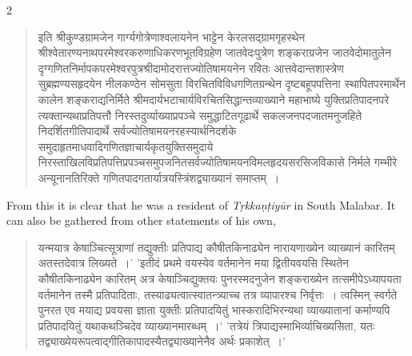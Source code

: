 \documentclass[11pt, openany]{book}
\begin{document}
\newpage
\thispagestyle{empty}
\begin{center}2\\\end{center}
\vspace{0.5cm}


\textendash

\begin{sloppypar} 
\begin{quote} 
इति श्रीकुण्डग्रामजेन
गार्ग्यगोत्रेणाश्वलायनेन भाट्टेन केरलसद्ग्रामगृहस्थेन श्रीश्वेतारण्यनाथपरमेश्वरकरुणाधिकरणभूतविग्रहेण 
जातवेदःपुत्रेण शङ्कराग्रजेन जातवेदोमातुलेन दृग्गणितनिर्मापकपरमेश्वरपुत्रश्रीदामोदरात्तज्योतिषामयनेन रवितः आत्तवेदान्तशास्त्रेण सुब्रह्मण्यसहृदयेन नीलकण्ठेन सोमसुता विरचितविविधगणितग्रन्थेन दृष्टबहूपपत्तिना स्थापितपरमार्थेन कालेन शङ्कराद्यनिर्मिते श्रीमदार्यभटाचार्यविरचितसिद्धान्तव्याख्याने महाभाष्ये युक्तिप्रतिपादनपरे त्यक्तान्यथाप्रतिपत्तौ निरस्तदुर्व्याख्याप्रपञ्चे समुद्धाटितगूढार्थे सकलजनपदजातमनुजहिते निदर्शितगीतिपादार्थे सर्वज्योतिषामयनरहस्यार्थनिदर्शके समुदाहृतमाधवादिगणितज्ञाचार्यकृतयुक्तिसमुदाये
निरस्ताखिलविप्रतिपत्तिप्रपञ्चसमुपजनितसर्वज्योतिषामयनविमलहृदयसरसिजविकासे निर्मले गम्भीरे अन्यूनानतिरिक्ते 
गणितपादगतार्यात्रयस्त्रिंशद्व्याख्यानं समाप्तम्~। 
\end{quote} 
\end{sloppypar} 
{\en From this it is clear that he was a resident of \emph{Tṛkkaṇṭiyūr} in South Malabar. It can also be gathered from other statements of his own,}

\begin{quote} 
यन्मयात्र केषाञ्चित्सूत्राणां तद्युक्तीः प्रतिपाद्य कौषीतकिनाढ्येन नारायणाख्येन व्याख्यानं कारितम् अतस्तदेवात्र 
लिख्यते~।' 'इतीदं प्रथमे वयस्येव वर्तमानेन मया द्वितीयवयसि स्थितेन कौषीतकिनाढ्येन कारितम् अत्र केषाञ्चिद्युक्तयः पुनरस्मदनुजेन शङ्कराख्येन तत्समीपेऽध्यापयता वर्तमानेन तस्मै प्रतिपादिताः, तस्याढ्यत्वात्स्वातन्त्र्याच्च तत्र व्यापारश्च निर्वृत्तः~। त्वस्मिन् स्वर्गते पुनरत एव मयाद्य प्रवयसा ज्ञाता युक्तीः प्रतिपादयितुं भास्करादिभिरन्यथा व्याख्यातानां कर्माण्यपि प्रतिपादयितुं यथाकथञ्चिदेव व्याख्यानमारब्धम्~।' 'तत्रेयं त्रिपाद्यस्माभिर्व्याचिख्यसिता, यतः तद्व्याख्येयरूपत्वाद्गीतिकापादस्यैतद्व्याख्यानेनैव अर्थः प्रकाशेत्~।'
\end{quote} 
\end{document}
